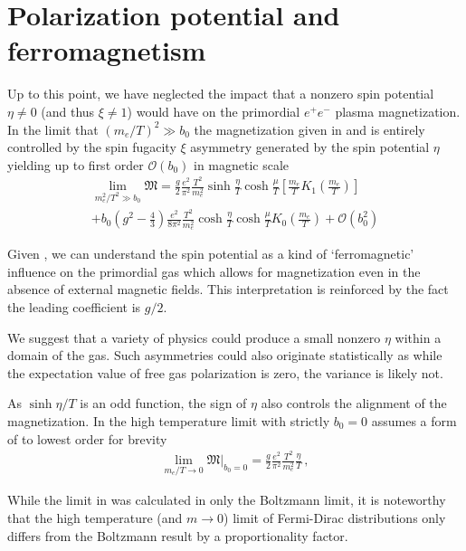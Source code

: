 \section{Polarization potential and ferromagnetism}
\label{sec:ferro}
\noindent Up to this point, we have neglected the impact that a nonzero spin potential $\eta\neq0$ (and thus $\xi\neq1$) would have on the primordial $e^{+}e^{-}$ plasma magnetization. In the limit that $(m_{e}/T)^2\gg b_0$ the magnetization given in  and  is entirely controlled by the spin fugacity $\xi$ asymmetry generated by the spin potential $\eta$ yielding up to first order $\mathcal{O}(b_{0})$ in magnetic scale
\begin{multline}
 \label{ferro}
 \lim_{m_{e}^{2}/T^{2}\gg b_0}{\mathfrak M}=\frac{g}{2}\frac{e^{2}}{\pi^{2}}\frac{T^{2}}{m_{e}^{2}}\sinh{\frac{\eta}{T}}\cosh{\frac{\mu}{T}}\left[\frac{m_{e}}{T}K_{1}\left(\frac{m_{e}}{T}\right)\right]\\
 +b_{0}\left(g^{2}-\frac{4}{3}\right)\frac{e^{2}}{8\pi^{2}}\frac{T^{2}}{m_{e}^{2}}\cosh{\frac{\eta}{T}}\cosh{\frac{\mu}{T}}K_{0}\left(\frac{m_{e}}{T}\right)
 +\mathcal{O}\left(b_{0}^{2}\right)
\end{multline}

Given , we can understand the spin potential as a kind of `ferromagnetic' influence on the primordial gas which allows for magnetization even in the absence of external magnetic fields. This interpretation is reinforced by the fact the leading coefficient is $g/2$.

We suggest that a variety of physics could produce a small nonzero $\eta$ within a domain of the gas. Such asymmetries could also originate statistically as while the expectation value of free gas polarization is zero, the variance is likely not.

As $\sinh{\eta/T}$ is an odd function, the sign of $\eta$ also controls the alignment of the magnetization. In the high temperature limit  with strictly $b_{0}=0$ assumes a form of to lowest order for brevity
\begin{align}
 \label{hiTferro}
 \lim_{m_{e}/T\rightarrow0}{\mathfrak M}\vert_{b_{0}=0}=\frac{g}{2}\frac{e^{2}}{\pi^{2}}\frac{T^{2}}{m_{e}^{2}}\frac{\eta}{T}\,,
\end{align}

While the limit in  was calculated in only the Boltzmann limit, it is noteworthy that the high temperature (and $m\rightarrow0$) limit of Fermi-Dirac distributions only differs from the Boltzmann result by a proportionality factor. 

